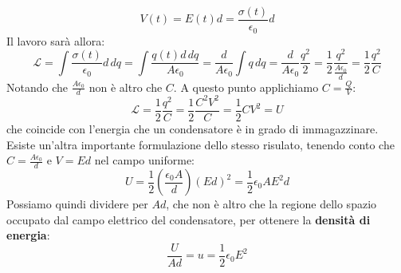 \documentclass[a4paper,12pt]{article}
\begin{document}
$$ V(t) = E(t)d = \frac{\sigma(t)}{\epsilon_0}d $$
Il lavoro sarà allora:
$$ \mathcal{L} = \int \frac{\sigma(t)}{\epsilon_0}d\,dq = \int \frac{q(t)d\, dq}{A\epsilon_0} = \frac{d}{A\epsilon_0}\int q\, dq = \frac{d}{A\epsilon_0} \frac{q^2}{2} = \frac{1}{2} \frac{q^2}{\frac{A\epsilon_0}{d}} = \frac{1}{2} \frac{q^2}{C} $$
Notando che $ \frac{A\epsilon_0}{d}$ non è altro che $C$. A questo punto applichiamo $C = \frac{Q}{V}$:
$$ \mathcal{L} = \frac{1}{2} \frac{q^2}{C} = \frac{1}{2} \frac{C^2V^2}{C} = \frac{1}{2}CV^2  = U$$
che coincide con l'energia che un condensatore è in grado di immagazzinare. Esiste un'altra importante formulazione dello stesso risulato, tenendo conto che $C = \frac{A\epsilon_0}{d}$ e $V=Ed$ nel campo uniforme:
$$ U = \frac{1}{2} \left( \frac{\epsilon_0 A}{d} \right)(Ed)^2 = \frac{1}{2}\epsilon_0AE^2d$$
Possiamo quindi dividere per $Ad$, che non è altro che la regione dello spazio occupato dal campo elettrico del condensatore, per ottenere la \textbf{densità di energia}:
$$ \frac{U}{Ad} = u = \frac{1}{2} \epsilon_0 E^2 $$
\end{document}
